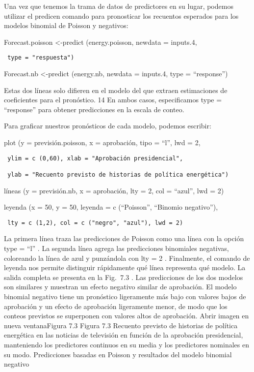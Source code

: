 \documentclass[
]{book}
\begin{document}
Una vez que tenemos la trama de datos de predictores en su lugar, podemos utilizar el predicen comando para pronosticar los recuentos esperados para los modelos binomial de Poisson y negativos:

Forecast.poisson \textless-predict (energy.poisson, newdata = inputs.4,

\begin{verbatim}
 type = "respuesta")
\end{verbatim}

Forecast.nb \textless-predict (energy.nb, newdata = inputs.4, type = ``response'')

Estas dos líneas solo difieren en el modelo del que extraen estimaciones de coeficientes para el pronóstico. 14 En ambos casos, especificamos type = ``response'' para obtener predicciones en la escala de conteo.

Para graficar nuestros pronósticos de cada modelo, podemos escribir:

plot (y = previsión.poisson, x = aprobación, tipo = ``l'', lwd = 2,

\begin{verbatim}
 ylim = c (0,60), xlab = "Aprobación presidencial",

 ylab = "Recuento previsto de historias de política energética")
\end{verbatim}

líneas (y = previsión.nb, x = aprobación, lty = 2, col = ``azul'', lwd = 2)

leyenda (x = 50, y = 50, leyenda = c (``Poisson'', ``Binomio negativo''),

\begin{verbatim}
 lty = c (1,2), col = c ("negro", "azul"), lwd = 2)
\end{verbatim}

La primera línea traza las predicciones de Poisson como una línea con la opción type = ``l'' . La segunda línea agrega las predicciones binomiales negativas, coloreando la línea de azul y punzándola con lty = 2 . Finalmente, el comando de leyenda nos permite distinguir rápidamente qué línea representa qué modelo. La salida completa se presenta en la Fig.  7.3 . Las predicciones de los dos modelos son similares y muestran un efecto negativo similar de aprobación. El modelo binomial negativo tiene un pronóstico ligeramente más bajo con valores bajos de aprobación y un efecto de aprobación ligeramente menor, de modo que los conteos previstos se superponen con valores altos de aprobación.
Abrir imagen en nueva ventanaFigura 7.3
Figura 7.3
Recuento previsto de historias de política energética en las noticias de televisión en función de la aprobación presidencial, manteniendo los predictores continuos en su media y los predictores nominales en su modo. Predicciones basadas en Poisson y resultados del modelo binomial negativo
\end{document}
